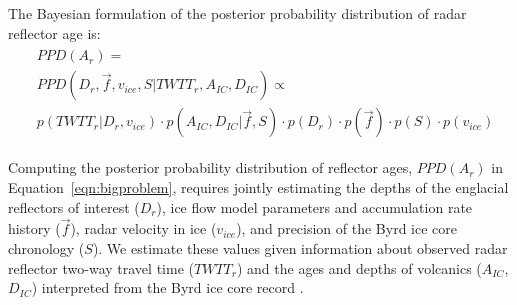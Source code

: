 The Bayesian formulation of the posterior probability distribution of radar reflector age is:
\begin{equation}\label{eqn:bigproblem}
\begin{split} %
\begin{aligned}
& PPD(A_r)  =   \\
&PPD(D_r,\vec{f},v_{ice},S | TWTT_r,A_{IC},D_{IC})  \propto  \\
&        p(TWTT_r | D_r,v_{ice}) \cdot p(A_{IC},D_{IC} | \vec{f},S)  \cdot p(D_r) \cdot p(\vec{f}) \cdot p(S) \cdot p(v_{ice})
\end{aligned}
\end{split}
\end{equation}

Computing the posterior probability distribution of reflector ages, $PPD(A_r)$ in Equation~\ref{eqn:bigproblem}, requires jointly estimating the depths of the englacial reflectors of interest ($D_r$), ice flow model parameters and accumulation rate history ($\vec{f}$), radar velocity in ice ($v_{ice}$), and precision of the Byrd ice core chronology ($S$). We estimate these values given information about observed radar reflector two-way travel time ($TWTT_r$) and the ages and depths of volcanics ($A_{IC}$, $D_{IC}$) interpreted from the Byrd ice core record \citep{hammer1997}.


